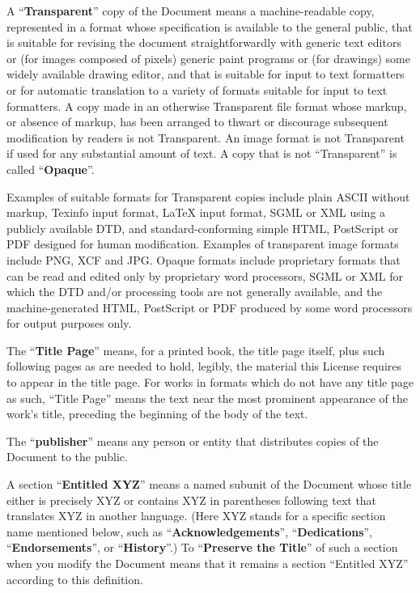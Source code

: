 \documentclass[10pt,a4paper,ngerman,titlepage,tocindentauto]{article}
\begin{document}
\begin{multicols}{3}
{					A ``\textbf{Transparent}'' copy of the Document means a machine-readable copy,
					represented in a format whose specification is available to the
					general public, that is suitable for revising the document
					straightforwardly with generic text editors or (for images composed of
					pixels) generic paint programs or (for drawings) some widely available
					drawing editor, and that is suitable for input to text formatters or
					for automatic translation to a variety of formats suitable for input
					to text formatters.  A copy made in an otherwise Transparent file
					format whose markup, or absence of markup, has been arranged to thwart
					or discourage subsequent modification by readers is not Transparent.
					An image format is not Transparent if used for any substantial amount
					of text.  A copy that is not ``Transparent'' is called ``\textbf{Opaque}''.

					Examples of suitable formats for Transparent copies include plain
					ASCII without markup, Texinfo input format, LaTeX input format, SGML
					or XML using a publicly available DTD, and standard-conforming simple
					HTML, PostScript or PDF designed for human modification.  Examples of
					transparent image formats include PNG, XCF and JPG.  Opaque formats
					include proprietary formats that can be read and edited only by
					proprietary word processors, SGML or XML for which the DTD and/or
					processing tools are not generally available, and the
					machine-generated HTML, PostScript or PDF produced by some word
					processors for output purposes only.

					The ``\textbf{Title Page}'' means, for a printed book, the title page itself,
					plus such following pages as are needed to hold, legibly, the material
					this License requires to appear in the title page.  For works in
					formats which do not have any title page as such, ``Title Page'' means
					the text near the most prominent appearance of the work's title,
					preceding the beginning of the body of the text.

					The ``\textbf{publisher}'' means any person or entity that distributes
					copies of the Document to the public.

					A section ``\textbf{Entitled XYZ}'' means a named subunit of the Document whose
					title either is precisely XYZ or contains XYZ in parentheses following
					text that translates XYZ in another language.  (Here XYZ stands for a
					specific section name mentioned below, such as ``\textbf{Acknowledgements}'',
					``\textbf{Dedications}'', ``\textbf{Endorsements}'', or ``\textbf{History}''.)  
					To ``\textbf{Preserve the Title}''
					of such a section when you modify the Document means that it remains a
					section ``Entitled XYZ'' according to this definition.

}
\end{multicols}
\end{document}
